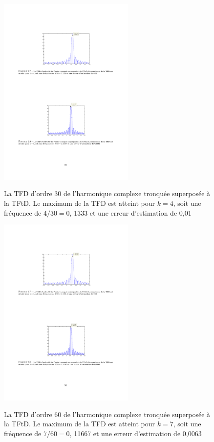 \begin{definition}
\begin{figure}
  \centering
  \includegraphics[width=0.6\textwidth]{Figures/Figure2-7}\\
  \caption{La TFD d'ordre 30 de l'harmonique complexe tronqu\'{e}e superpos\'{e}e \`{a} la TFtD. Le maximum de la TFD est atteint pour $k=4$, soit une fr\'{e}quence de $4/30=0$, 1333 et une erreur d'estimation de 0,01}\label{fig:figure2-7}
\end{figure}


\begin{figure}
  \centering
  \includegraphics[width=0.6\textwidth]{Figures/Figure2-8}\\
  \caption{La TFD d'ordre 60 de l'harmonique complexe tronqu\'{e}e superpos\'{e}e \`{a} la TFtD. Le maximum de la TFD est atteint pour $k=7$, soit une fr\'{e}quence de $7/60=0$, 11667 et une erreur d'estimation de 0,0063}\label{fig:figure2-8}
\end{figure}





\end{definition}
